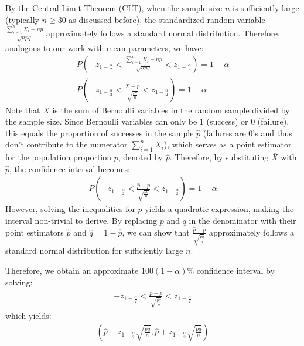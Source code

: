 By the Central Limit Theorem (CLT), when the sample size \( n \) is sufficiently large (typically \( n \geq 30 \) as discussed before),
the standardized random variable \( \frac{\sum_{i = 1}^{n} X_i - np}{\sqrt{npq}} \) approximately follows a standard normal distribution.
Therefore, analogous to our work with mean parameters, we have:
\begin{gather*}
    P(-z_{1 - \frac{\alpha}{2}} < \frac{\sum_{i = 1}^{n} X_i - np}{\sqrt{npq}} < z_{1 - \frac{\alpha}{2}}) = 1 - \alpha\\
    P(-z_{1 - \frac{\alpha}{2}} < \frac{\bar{X} -  p}{\sqrt{\frac{pq}{n}}} < z_{1 - \frac{\alpha}{2}}) = 1 - \alpha
\end{gather*}
Note that \( \bar{X} \) is the sum of Bernoulli variables in the random sample divided by the sample size.
Since Bernoulli variables can only be 1 (success) or 0 (failure), this equals the proportion of successes in the sample \( \hat{p} \) (failures are 0's and thus don't contribute to the numerator \( \sum_{i = 1}^{n} X_i \)),
which serves as a point estimator for the population proportion \( p \), denoted by \( \hat{p} \).
Therefore, by substituting \( \bar{X} \) with \( \hat{p} \), the confidence interval becomes:
\begin{gather*}
    P(-z_{1 - \frac{\alpha}{2}} < \frac{\hat{p} -  p}{\sqrt{\frac{pq}{n}}} < z_{1 - \frac{\alpha}{2}}) = 1 - \alpha
\end{gather*}
However, solving the inequalities for \( p \) yields a quadratic expression, making the interval non-trivial to derive.
By replacing \( p \) and \( q \) in the denominator with their point estimators \( \hat{p} \) and \( \hat{q} = 1 - \hat{p} \),
we can show that \( \frac{\hat{p} -  p}{\sqrt{\frac{\hat{p}\hat{q}}{n}}} \) approximately follows a standard normal distribution for sufficiently large \( n \).

Therefore, we obtain an approximate \( 100(1 - \alpha)\% \) confidence interval by solving:
\begin{gather*}
    -z_{1 - \frac{\alpha}{2}} < \frac{\hat{p} -  p}{\sqrt{\frac{\hat{p}\hat{q}}{n}}} < z_{1 - \frac{\alpha}{2}}
\end{gather*}
which yields:
\begin{gather*}
    (\hat{p} - z_{1 - \frac{\alpha}{2}} \sqrt{\frac{\hat{p}\hat{q}}{n}}, \hat{p} + z_{1 - \frac{\alpha}{2}} \sqrt{\frac{\hat{p}\hat{q}}{n}} )
\end{gather*}